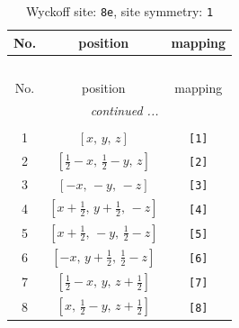 \documentclass[fleqn,8pt]{jsarticle}
\begin{document}
\renewcommand{\arraystretch}{1.2}
\begin{longtable}{ccc}
\caption{Wyckoff site: {\tt 8e}, site symmetry: {\tt 1}}
 \\
 \hline \hline
No. & position & mapping \\ \hline \endfirsthead

\multicolumn{2}{l}{\tablename\ \thetable{}} \\
 \hline \hline
No. & position & mapping \\ \hline \endhead

 \hline \hline
\multicolumn{2}{r}{\footnotesize\it continued ...} \\ \endfoot

 \hline \hline
\multicolumn{2}{r}{} \\ \endlastfoot

1 & $\left[ x,\, y,\, z \right]$ & {\tt [1]} \\ \hline
2 & $\left[ \frac{1}{2} - x,\, \frac{1}{2} - y,\, z \right]$ & {\tt [2]} \\ \hline
3 & $\left[ - x,\, - y,\, - z \right]$ & {\tt [3]} \\ \hline
4 & $\left[ x + \frac{1}{2},\, y + \frac{1}{2},\, - z \right]$ & {\tt [4]} \\ \hline
5 & $\left[ x + \frac{1}{2},\, - y,\, \frac{1}{2} - z \right]$ & {\tt [5]} \\ \hline
6 & $\left[ - x,\, y + \frac{1}{2},\, \frac{1}{2} - z \right]$ & {\tt [6]} \\ \hline
7 & $\left[ \frac{1}{2} - x,\, y,\, z + \frac{1}{2} \right]$ & {\tt [7]} \\ \hline
8 & $\left[ x,\, \frac{1}{2} - y,\, z + \frac{1}{2} \right]$ & {\tt [8]} \\
\end{longtable}
\end{document}
